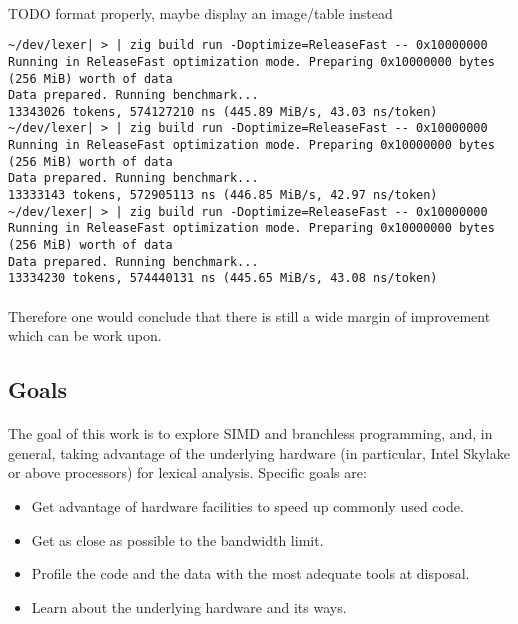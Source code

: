 \documentclass[12pt]{article}
\begin{document}
	\paragraph{}TODO format properly, maybe display an image/table instead
\begin{lstlisting}
~/dev/lexer| > | zig build run -Doptimize=ReleaseFast -- 0x10000000                                                                                                                      
Running in ReleaseFast optimization mode. Preparing 0x10000000 bytes (256 MiB) worth of data
Data prepared. Running benchmark...
13343026 tokens, 574127210 ns (445.89 MiB/s, 43.03 ns/token)
~/dev/lexer| > | zig build run -Doptimize=ReleaseFast -- 0x10000000                                                                                                                      
Running in ReleaseFast optimization mode. Preparing 0x10000000 bytes (256 MiB) worth of data
Data prepared. Running benchmark...
13333143 tokens, 572905113 ns (446.85 MiB/s, 42.97 ns/token)
~/dev/lexer| > | zig build run -Doptimize=ReleaseFast -- 0x10000000                                                                                                                      
Running in ReleaseFast optimization mode. Preparing 0x10000000 bytes (256 MiB) worth of data
Data prepared. Running benchmark...
13334230 tokens, 574440131 ns (445.65 MiB/s, 43.08 ns/token)
\end{lstlisting}
	\paragraph{}Therefore one would conclude that there is still a wide margin of improvement which can be work upon.

	\subsection{Goals}
	\paragraph{}The goal of this work is to explore SIMD and branchless programming, and, in general, taking advantage of the underlying hardware (in particular, Intel Skylake or above processors) for lexical analysis.
	Specific goals are:
	\begin{itemize}
		\item Get advantage of hardware facilities to speed up commonly used code.
		\item Get as close as possible to the bandwidth limit.
		\item Profile the code and the data with the most adequate tools at disposal.
		\item Learn about the underlying hardware and its ways.
	\end{itemize}
\end{document}
